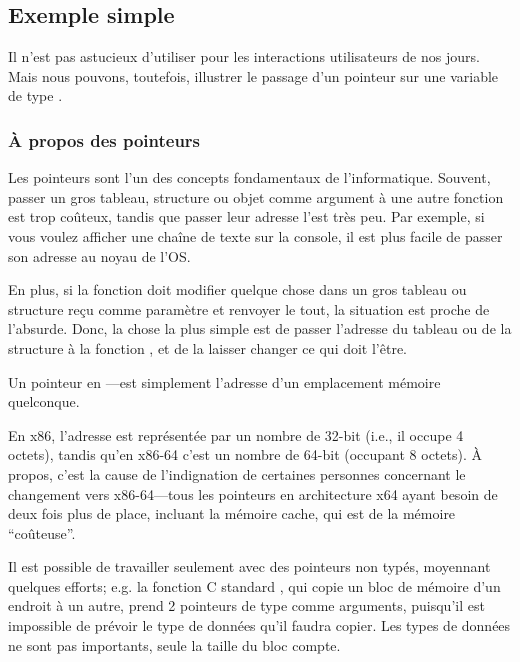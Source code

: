 \subsection{Exemple simple}



Il n'est pas astucieux d'utiliser \scanf pour les interactions utilisateurs de nos jours.
Mais nous pouvons, toutefois, illustrer le passage d'un pointeur sur une variable
de type \Tint.

\subsubsection{À propos des pointeurs}
\myindex{\CLanguageElements!\Pointers}

Les pointeurs sont l'un des concepts fondamentaux de l'informatique.
Souvent, passer un gros tableau, structure ou objet comme argument à une autre fonction
est trop coûteux, tandis que passer leur adresse l'est très peu.
Par exemple, si vous voulez afficher une chaîne de texte sur la console, il est
plus facile de passer son adresse au noyau de l'\ac{OS}.

En plus, si la fonction  doit modifier quelque chose dans
un gros tableau ou structure reçu comme paramètre et renvoyer le tout, la situation
est proche de l'absurde.
Donc, la chose la plus simple est de passer l'adresse du tableau ou de la structure
à la fonction , et de la laisser changer ce qui doit l'être.

Un pointeur en \CCpp---est simplement l'adresse d'un emplacement mémoire quelconque.

En x86, l'adresse est représentée par un nombre de 32-bit (i.e., il occupe 4 octets),
tandis qu'en x86-64 c'est un nombre de 64-bit (occupant 8 octets).
À propos, c'est la cause de l'indignation de certaines personnes concernant le
changement vers x86-64---tous les pointeurs en architecture x64 ayant besoin de deux
fois plus de place, incluant la mémoire cache, qui est de la mémoire ``coûteuse''.

Il est possible de travailler seulement avec des pointeurs non typés, moyennant
quelques efforts; e.g. la fonction C standard , qui copie un bloc de
mémoire d'un endroit à un autre, prend 2 pointeurs de type  comme arguments,
puisqu'il est impossible de prévoir le type de données qu'il faudra copier. Les types
de données ne sont pas importants, seule la taille du bloc compte.

